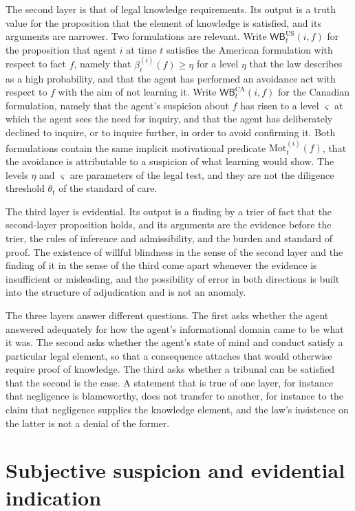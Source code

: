 \documentclass[11pt]{article}
\newcommand{\WB}{\mathsf{WB}}
\theoremstyle{plain}
\theoremstyle{definition}
\begin{document}
The second layer is that of legal knowledge requirements. Its output is a truth value for the proposition that the element of knowledge is satisfied, and its arguments are narrower. Two formulations are relevant. Write $\WB^{\mathrm{US}}_t(i,f)$ for the proposition that agent $i$ at time $t$ satisfies the American formulation with respect to fact $f$, namely that $\beta^{(i)}_t(f)\ge\eta$ for a level $\eta$ that the law describes as a high probability, and that the agent has performed an avoidance act with respect to $f$ with the aim of not learning it. Write $\WB^{\mathrm{CA}}_t(i,f)$ for the Canadian formulation, namely that the agent's suspicion about $f$ has risen to a level $\varsigma$ at which the agent sees the need for inquiry, and that the agent has deliberately declined to inquire, or to inquire further, in order to avoid confirming it. Both formulations contain the same implicit motivational predicate $\mathrm{Mot}^{(i)}_t(f)$, that the avoidance is attributable to a suspicion of what learning would show. The levels $\eta$ and $\varsigma$ are parameters of the legal test, and they are not the diligence threshold $\theta_t$ of the standard of care.

The third layer is evidential. Its output is a finding by a trier of fact that the second-layer proposition holds, and its arguments are the evidence before the trier, the rules of inference and admissibility, and the burden and standard of proof. The existence of willful blindness in the sense of the second layer and the finding of it in the sense of the third come apart whenever the evidence is insufficient or misleading, and the possibility of error in both directions is built into the structure of adjudication and is not an anomaly.

The three layers answer different questions. The first asks whether the agent answered adequately for how the agent's informational domain came to be what it was. The second asks whether the agent's state of mind and conduct satisfy a particular legal element, so that a consequence attaches that would otherwise require proof of knowledge. The third asks whether a tribunal can be satisfied that the second is the case. A statement that is true of one layer, for instance that negligence is blameworthy, does not transfer to another, for instance to the claim that negligence supplies the knowledge element, and the law's insistence on the latter is not a denial of the former.

\section{Subjective suspicion and evidential indication}
\end{document}
